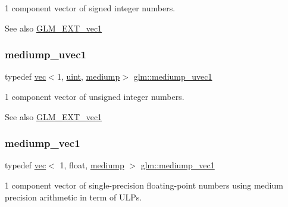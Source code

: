 1 component vector of signed integer numbers.

\begin{DoxySeeAlso}{See also}
\hyperlink{group__ext__vec1}{G\+L\+M\+\_\+\+E\+X\+T\+\_\+vec1} 
\end{DoxySeeAlso}
\mbox{\label{group__ext__vec1_ga30942ba23745b3fd4ec1fbd3068f7de4}} 
\subsubsection{\texorpdfstring{mediump\+\_\+uvec1}{mediump\_uvec1}}
{\footnotesize\ttfamily typedef \hyperlink{structglm_1_1vec}{vec}$<$1, \hyperlink{group__core__precision_ga4fd29415871152bfb5abd588334147c8}{uint}, \hyperlink{namespaceglm_a36ed105b07c7746804d7fdc7cc90ff25a6416f3ea0c9025fb21ed50c4d6620482}{mediump}$>$ \hyperlink{group__ext__vec1_ga30942ba23745b3fd4ec1fbd3068f7de4}{glm\+::mediump\+\_\+uvec1}}

1 component vector of unsigned integer numbers.

\begin{DoxySeeAlso}{See also}
\hyperlink{group__ext__vec1}{G\+L\+M\+\_\+\+E\+X\+T\+\_\+vec1} 
\end{DoxySeeAlso}
\mbox{\label{group__ext__vec1_gab1c2ec8c0cbca8b1f2346f37926b77a7}} 
\subsubsection{\texorpdfstring{mediump\+\_\+vec1}{mediump\_vec1}}
{\footnotesize\ttfamily typedef \hyperlink{structglm_1_1vec}{vec}$<$ 1, float, \hyperlink{namespaceglm_a36ed105b07c7746804d7fdc7cc90ff25a6416f3ea0c9025fb21ed50c4d6620482}{mediump} $>$ \hyperlink{group__ext__vec1_gab1c2ec8c0cbca8b1f2346f37926b77a7}{glm\+::mediump\+\_\+vec1}}

1 component vector of single-\/precision floating-\/point numbers using medium precision arithmetic in term of U\+L\+Ps.

